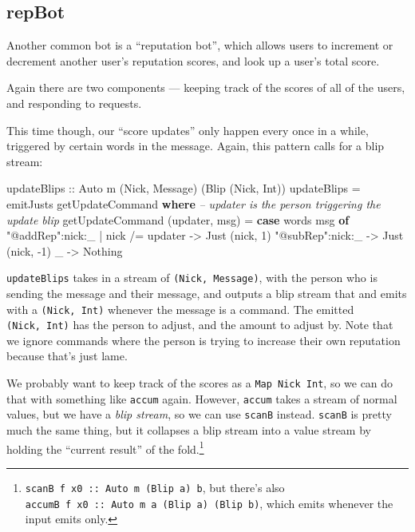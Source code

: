 \documentclass[]{article}
\newenvironment{Shaded}{}{}
\newcommand{\KeywordTok}[1]{\textcolor[rgb]{0.00,0.44,0.13}{\textbf{{#1}}}}
\newcommand{\DataTypeTok}[1]{\textcolor[rgb]{0.56,0.13,0.00}{{#1}}}
\newcommand{\DecValTok}[1]{\textcolor[rgb]{0.25,0.63,0.44}{{#1}}}
\newcommand{\StringTok}[1]{\textcolor[rgb]{0.25,0.44,0.63}{{#1}}}
\newcommand{\CommentTok}[1]{\textcolor[rgb]{0.38,0.63,0.69}{\textit{{#1}}}}
\newcommand{\OtherTok}[1]{\textcolor[rgb]{0.00,0.44,0.13}{{#1}}}
\newcommand{\FunctionTok}[1]{\textcolor[rgb]{0.02,0.16,0.49}{{#1}}}
\newcommand{\NormalTok}[1]{{#1}}
\begin{document}
\subsection{repBot}\label{repbot}

Another common bot is a ``reputation bot'', which allows users to increment or
decrement another user's reputation scores, and look up a user's total score.

Again there are two components --- keeping track of the scores of all of the
users, and responding to requests.

This time though, our ``score updates'' only happen every once in a while,
triggered by certain words in the message. Again, this pattern calls for a blip
stream:

\begin{Shaded}
\begin{Highlighting}[]
\OtherTok{updateBlips ::} \DataTypeTok{Auto} \NormalTok{m (}\DataTypeTok{Nick}\NormalTok{, }\DataTypeTok{Message}\NormalTok{) (}\DataTypeTok{Blip} \NormalTok{(}\DataTypeTok{Nick}\NormalTok{, }\DataTypeTok{Int}\NormalTok{))}
\NormalTok{updateBlips }\FunctionTok{=} \NormalTok{emitJusts getUpdateCommand}
  \KeywordTok{where}
    \CommentTok{-- updater is the person triggering the update blip}
    \NormalTok{getUpdateCommand (updater, msg) }\FunctionTok{=}
      \KeywordTok{case} \NormalTok{words msg }\KeywordTok{of}
        \StringTok{"@addRep"}\FunctionTok{:}\NormalTok{nick}\FunctionTok{:}\NormalTok{_ }\FunctionTok{|} \NormalTok{nick }\FunctionTok{/=} \NormalTok{updater }\OtherTok{->} \DataTypeTok{Just} \NormalTok{(nick, }\DecValTok{1}\NormalTok{)}
        \StringTok{"@subRep"}\FunctionTok{:}\NormalTok{nick}\FunctionTok{:}\NormalTok{_                   }\OtherTok{->} \DataTypeTok{Just} \NormalTok{(nick, }\FunctionTok{-}\DecValTok{1}\NormalTok{)}
        \NormalTok{_                                  }\OtherTok{->} \DataTypeTok{Nothing}
\end{Highlighting}
\end{Shaded}

\texttt{updateBlips} takes in a stream of \texttt{(Nick,\ Message)}, with the
person who is sending the message and their message, and outputs a blip stream
that and emits with a \texttt{(Nick,\ Int)} whenever the message is a command.
The emitted \texttt{(Nick,\ Int)} has the person to adjust, and the amount to
adjust by. Note that we ignore commands where the person is trying to increase
their own reputation because that's just lame.

We probably want to keep track of the scores as a \texttt{Map\ Nick\ Int}, so we
can do that with something like \texttt{accum} again. However, \texttt{accum}
takes a stream of normal values, but we have a \emph{blip stream}, so we can use
\texttt{scanB} instead. \texttt{scanB} is pretty much the same thing, but it
collapses a blip stream into a value stream by holding the ``current result'' of
the fold.\footnote{\texttt{scanB\ f\ x0\ ::\ Auto\ m\ (Blip\ a)\ b}, but there's
  also \texttt{accumB\ f\ x0\ ::\ Auto\ m\ a\ (Blip\ a)\ (Blip\ b)}, which emits
  whenever the input emits only.}
\end{document}
